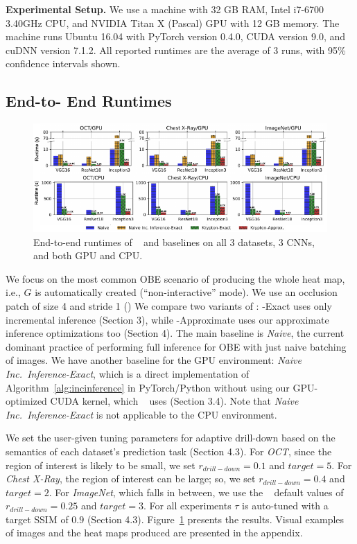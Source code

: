 \vspace{2mm}
\noindent \textbf{Experimental Setup.}
We use a machine with 32 GB RAM, Intel i7-6700 3.40GHz CPU, and NVIDIA Titan X (Pascal) GPU with 12 GB memory. %
The machine runs Ubuntu 16.04 with PyTorch version 0.4.0, CUDA version 9.0, and cuDNN version 7.1.2.
All reported runtimes are the average of 3 runs, with 95\% confidence intervals shown.

\subsection{End-to- End Runtimes}

\begin{figure}[t]
\includegraphics[width=\textwidth]{images/5_1_all_edited_b}
\vspace{-6mm}
\caption{End-to-end runtimes of \system~ and baselines on all 3 datasets, 3 CNNs, and both GPU and CPU.}
\label{fig:5_1_all_edited}
\end{figure}

We focus on the most common OBE scenario of producing the whole heat map, i.e., $G$ is automatically created (``non-interactive'' mode). We use an occlusion patch of size 4 and stride 1 () We compare two variants of \system: \system-Exact uses only incremental inference (Section 3), while \system-Approximate uses our approximate inference optimizations too (Section 4). The main baseline is \textit{Naive}, the current dominant practice of performing full inference for OBE with just naive batching of images. We have another baseline for the GPU environment: \textit{Naive Inc.~Inference-Exact}, which is a direct implementation of Algorithm~\ref{alg:incinference} in PyTorch/Python without using our GPU-optimized CUDA kernel, which \system~ uses (Section 3.4). Note that \textit{Naive Inc.~Inference-Exact} is not applicable to the CPU environment.

We set the user-given tuning parameters for adaptive drill-down based on the semantics of each dataset's prediction task (Section 4.3). For \textit{OCT}, since the region of interest is likely to be small, we set $r_{drill-down}=0.1$ and $\mathit{target} = 5$. For \textit{Chest X-Ray}, the region of interest can be large; so, we set $r_{drill-down} = 0.4$ and $\mathit{target} = 2$. For \textit{ImageNet}, which falls in between, we use the \system~ default values of $r_{drill-down}=0.25$  and $\mathit{target} = 3$. For all experiments $\tau$ is auto-tuned with a target SSIM of $0.9$ (Section 4.3). Figure~\ref{fig:5_1_all_edited} presents the results. Visual examples of images and the heat maps produced are presented in the appendix.

